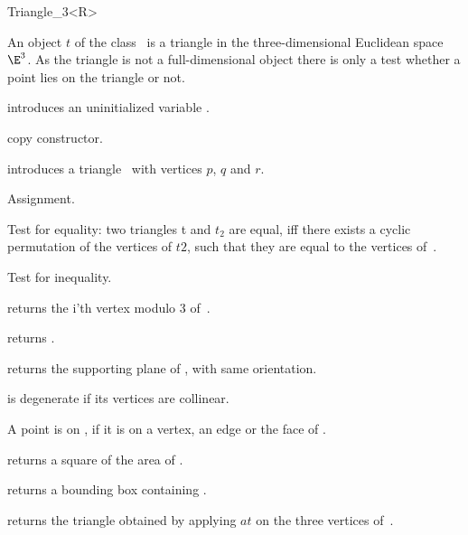 \begin{ccRefClass} {Triangle_3<R>}

\ccDefinition  An object $t$ of the class \ccRefName\ is a triangle in
the three-dimensional Euclidean space $\E^3$. As the triangle is not
a full-dimensional object there is only a test whether a point lies on
the triangle or not.
 
\ccCreation
{}

\ccHidden {}
             {introduces an uninitialized variable \ccVar.}

\ccHidden {}
 	    {copy constructor.}

            {introduces a triangle \ccVar\ with vertices $p$, $q$ and $r$.}

\ccOperations

\ccHidden {}
        {Assignment.}

       {Test for equality: two triangles t and $t_2$ are equal, iff there 
        exists a cyclic permutation of the vertices of $t2$, such that 
        they are equal to the vertices of~\ccVar.}

       {Test for inequality.}

       {returns the i'th vertex modulo 3  of~\ccVar.}

       {returns .}

       {returns the supporting plane of \ccVar, with same
       orientation.}

\ccPredicates

       {{\ccVar} is degenerate if its vertices are collinear.}

       {A point is on \ccVar, if it is on a vertex, an edge or the
        face of \ccVar.}


       {returns a square of the area of \ccVar.}

       {returns a bounding box containing \ccVar.}

       {returns the triangle obtained by applying $at$ on the three
        vertices of~\ccVar.}
\end{ccRefClass} 
